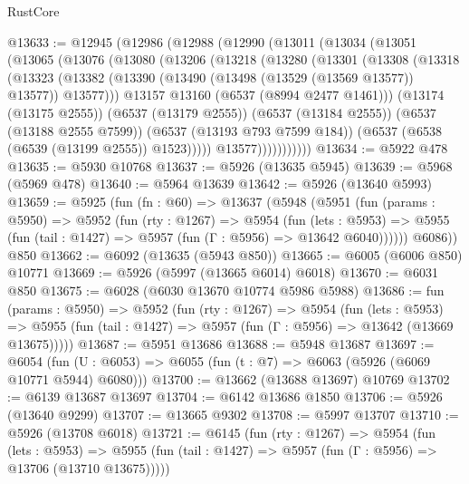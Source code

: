 \begin{lexlean}{RustCore}
\begin{coremodule}
@13633 := @12945
    (@12986
      (@12988
        (@12990
          (@13011
            (@13034
              (@13051
                (@13065
                  (@13076
                    (@13080
                      (@13206
                        (@13218
                          (@13280
                            (@13301
                              (@13308
                                (@13318
                                  (@13323
                                    (@13382
                                      (@13390
                                        (@13490 (@13498 (@13529 (@13569 @13577)) @13577))
                                        @13577)))
                                  @13157
                                  @13160
                                  (@6537 (@8994 @2477 @1461)))
                                (@13174 (@13175 @2555))
                                (@6537 (@13179 @2555))
                                (@6537 (@13184 @2555))
                                (@6537 (@13188 @2555 @7599))
                                (@6537 (@13193 @793 @7599 @184))
                                (@6537 (@6538 (@6539 (@13199 @2555)) @1523)))))
                          @13577)))))))))))
@13634 := @5922 @478
@13635 := @5930 @10768
@13637 := @5926 (@13635 @5945)
@13639 := @5968 (@5969 @478)
@13640 := @5964 @13639
@13642 := @5926 (@13640 @5993)
@13659 := @5925
    (fun (fn : @60) =>
    @13637
      (@5948
        (@5951
          (fun (params : @5950) =>
          @5952
            (fun (rty : @1267) =>
            @5954
              (fun (lets : @5953) =>
              @5955 (fun (tail : @1427) => @5957 (fun (Γ : @5956) => @13642 @6040))))))
        @6086))
    @850
@13662 := @6092 (@13635 (@5943 @850))
@13665 := @6005 (@6006 @850) @10771
@13669 := @5926 (@5997 (@13665 @6014) @6018)
@13670 := @6031 @850
@13675 := @6028 (@6030 @13670 @10774 @5986 @5988)
@13686 := fun (params : @5950) =>
  @5952
    (fun (rty : @1267) =>
    @5954
      (fun (lets : @5953) =>
      @5955 (fun (tail : @1427) => @5957 (fun (Γ : @5956) => @13642 (@13669 @13675)))))
@13687 := @5951 @13686
@13688 := @5948 @13687
@13697 := @6054
    (fun (U : @6053) => @6055 (fun (t : @7) => @6063 (@5926 (@6069 @10771 @5944) @6080)))
@13700 := @13662 (@13688 @13697) @10769
@13702 := @6139 @13687 @13697
@13704 := @6142 @13686 @1850
@13706 := @5926 (@13640 @9299)
@13707 := @13665 @9302
@13708 := @5997 @13707
@13710 := @5926 (@13708 @6018)
@13721 := @6145
    (fun (rty : @1267) =>
    @5954
      (fun (lets : @5953) =>
      @5955 (fun (tail : @1427) => @5957 (fun (Γ : @5956) => @13706 (@13710 @13675)))))

\end{coremodule}
\end{lexlean}
